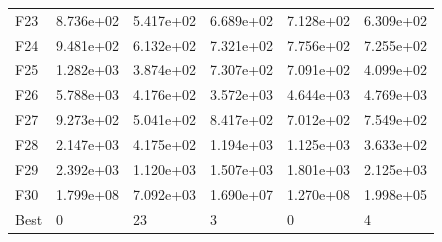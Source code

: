 \begin{tabular}{llllll}
F23  &  8.736e+02 &  5.417e+02 &  6.689e+02 &  7.128e+02 &  6.309e+02 \\
F24  &  9.481e+02 &  6.132e+02 &  7.321e+02 &  7.756e+02 &  7.255e+02 \\
F25  &  1.282e+03 &  3.874e+02 &  7.307e+02 &  7.091e+02 &  4.099e+02 \\
F26  &  5.788e+03 &  4.176e+02 &  3.572e+03 &  4.644e+03 &  4.769e+03 \\
F27  &  9.273e+02 &  5.041e+02 &  8.417e+02 &  7.012e+02 &  7.549e+02 \\
F28  &  2.147e+03 &  4.175e+02 &  1.194e+03 &  1.125e+03 &  3.633e+02 \\
F29  &  2.392e+03 &  1.120e+03 &  1.507e+03 &  1.801e+03 &  2.125e+03 \\
F30  &  1.799e+08 &  7.092e+03 &  1.690e+07 &  1.270e+08 &  1.998e+05 \\
Best &          0 &         23 &          3 &          0 &          4 \\
\bottomrule
\end{tabular}
